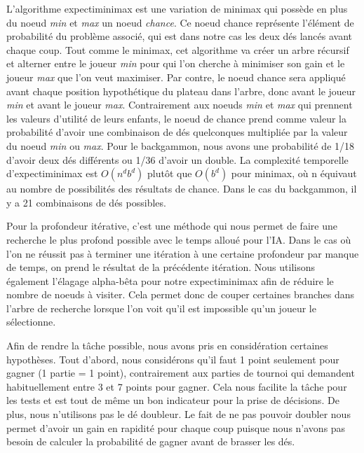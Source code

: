 \documentclass{article}
\begin{document}
L’algorithme expectiminimax est une variation de minimax qui possède en plus du
noeud \emph{min} et \emph{max} un noeud \emph{chance}. Ce noeud chance représente l’élément de
probabilité du problème associé, qui est dans notre cas les deux dés lancés
avant chaque coup. Tout comme le minimax, cet algorithme va créer un arbre
récursif et alterner entre le joueur \emph{min} pour qui l’on cherche à minimiser son
gain et le joueur \emph{max} que l’on veut maximiser. Par contre, le noeud chance sera
appliqué avant chaque position hypothétique du plateau dans l’arbre, donc avant
le joueur \emph{min} et avant le joueur \emph{max}.  Contrairement aux noeuds \emph{min} et
\emph{max} qui prennent les valeurs d’utilité de leurs enfants, le noeud de chance
prend comme valeur la probabilité d’avoir une combinaison de dés quelconques
multipliée par la valeur du noeud \emph{min} ou \emph{max}. Pour le backgammon, nous avons
une probabilité de 1/18 d’avoir deux dés différents ou 1/36 d’avoir un double.
La complexité temporelle d’expectiminimax est $ O(n^db^d) $ plutôt que $ O(b^d) $ pour
minimax, où n équivaut au nombre de possibilités des résultats de chance. Dans
le cas du backgammon, il y a 21 combinaisons de dés possibles.

Pour la profondeur itérative, c’est une méthode qui nous permet de faire une
recherche le plus profond possible avec le temps alloué pour l’IA. Dans le cas
où l’on ne réussit pas à terminer une itération à une certaine profondeur par
manque de temps, on prend le résultat de la précédente itération. Nous utilisons
également l’élagage alpha-bêta pour notre expectiminimax afin de réduire le
nombre de noeuds à visiter. Cela permet donc de couper certaines branches dans
l’arbre de recherche lorsque l'on voit qu'il est impossible qu'un joueur le
sélectionne.

Afin de rendre la tâche possible, nous avons  pris en considération certaines
hypothèses. Tout d’abord, nous considérons qu’il faut 1 point seulement pour
gagner (1 partie = 1 point), contrairement aux parties de tournoi qui demandent
habituellement entre 3 et 7 points pour gagner. Cela nous facilite la tâche pour
les tests et est tout de même un bon indicateur pour la prise de décisions. De
plus, nous n’utilisons pas le dé doubleur. Le fait de ne pas pouvoir doubler
nous permet d’avoir un gain en rapidité pour chaque coup puisque nous n’avons
pas besoin de calculer la probabilité de gagner avant de brasser les dés.
\end{document}
